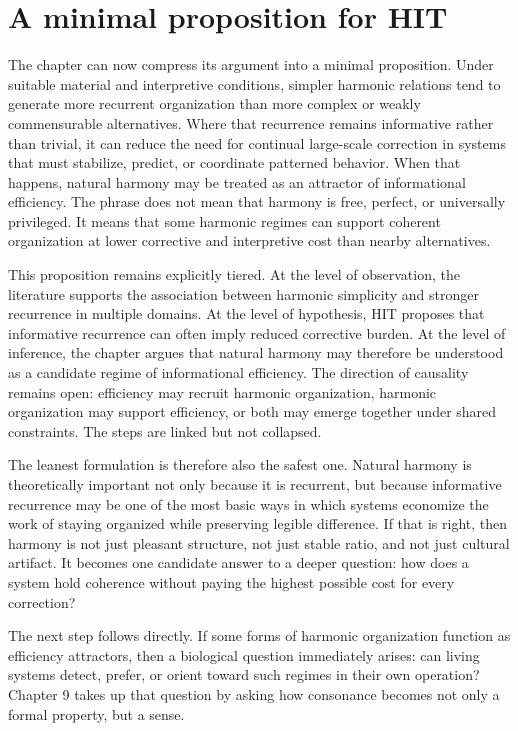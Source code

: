 \section{A minimal proposition for HIT}

The chapter can now compress its argument into a minimal proposition. Under suitable material and interpretive conditions, simpler harmonic relations tend to generate more recurrent organization than more complex or weakly commensurable alternatives. Where that recurrence remains informative rather than trivial, it can reduce the need for continual large-scale correction in systems that must stabilize, predict, or coordinate patterned behavior. When that happens, natural harmony may be treated as an attractor of informational efficiency. The phrase does not mean that harmony is free, perfect, or universally privileged. It means that some harmonic regimes can support coherent organization at lower corrective and interpretive cost than nearby alternatives.

This proposition remains explicitly tiered. At the level of observation, the literature supports the association between harmonic simplicity and stronger recurrence in multiple domains. At the level of hypothesis, HIT proposes that informative recurrence can often imply reduced corrective burden. At the level of inference, the chapter argues that natural harmony may therefore be understood as a candidate regime of informational efficiency. The direction of causality remains open: efficiency may recruit harmonic organization, harmonic organization may support efficiency, or both may emerge together under shared constraints. The steps are linked but not collapsed.

The leanest formulation is therefore also the safest one. Natural harmony is theoretically important not only because it is recurrent, but because informative recurrence may be one of the most basic ways in which systems economize the work of staying organized while preserving legible difference. If that is right, then harmony is not just pleasant structure, not just stable ratio, and not just cultural artifact. It becomes one candidate answer to a deeper question: how does a system hold coherence without paying the highest possible cost for every correction?

The next step follows directly. If some forms of harmonic organization function as efficiency attractors, then a biological question immediately arises: can living systems detect, prefer, or orient toward such regimes in their own operation? Chapter 9 takes up that question by asking how consonance becomes not only a formal property, but a sense.

